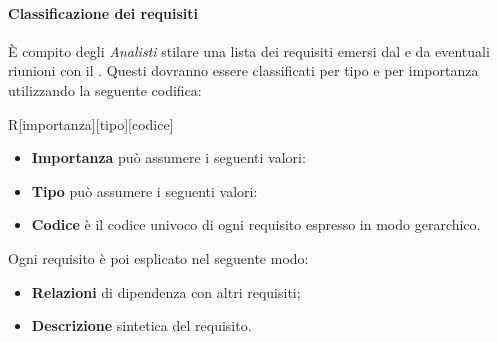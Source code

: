     \paragraph{Classificazione dei requisiti}
      È compito degli \emph{Analisti} stilare una lista dei requisiti emersi dal  e da eventuali riunioni con il . Questi dovranno essere
      classificati per tipo e per importanza utilizzando la seguente codifica:
      \begin{center}
        R[importanza][tipo][codice]
      \end{center}
      \begin{itemize}
        \item \textbf{Importanza} può assumere i seguenti valori:
          \bgroup
          \egroup
        \item \textbf{Tipo} può assumere i seguenti valori:
          \bgroup
          \egroup
        \item \textbf{Codice} è il codice univoco di ogni requisito espresso in modo gerarchico.
      \end{itemize}
      Ogni requisito è poi esplicato nel seguente modo:
      \begin{itemize}
        \item \textbf{Relazioni} di dipendenza con altri requisiti;
        \item \textbf{Descrizione} sintetica del requisito.
      \end{itemize}
